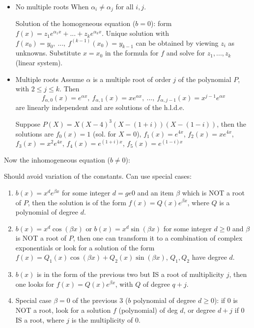 \begin{itemize}
    \item No multiple roots
          When $\alpha_i \ne \alpha_j$ for all $i, j$.

          Solution of the homogeneous equation ($b = 0$): form $f(x) = z_1 e^{\alpha_1 x} + ... + z_k e^{\alpha_k x}$.
          Unique solution with $f(x_0) = y_0,\ ...,\ f^{(k-1)}(x_0) = y_{k-1}$ can be obtained by viewing $z_i$ as unknowns. Substitute $x = x_0$ in
          the formula for $f$ and solve for $z_1, ..., z_k$ (linear system).

    \item Multiple roots
          Assume $\alpha$ is a multiple root of order $j$ of the polynomial $P$, with $2 \le j \le k$. Then
          \[ f_{\alpha,0}(x) = e^{\alpha x},\ f_{\alpha,1}(x) = x e^{\alpha x},\ ...,\ f_{\alpha,j-1}(x) = x^{j-1} e^{\alpha x} \]
          are linearly independent and are solutions of the h.l.d.e.

          \begin{example}
              Suppose $P(X) = X(X - 4)^3(X - (1+i))(X - (1 - i))$, then the solutions are
              $f_0(x) = 1$ (sol. for $X=0$), $f_1(x) = e^{4x}$, $f_2(x) = xe^{4x}$, $f_3(x) = x^2 e^{4x}$,
              $f_4(x) = e^{(1+i) x}$, $f_5(x) = e^{(1-i) x}$
          \end{example}

\end{itemize}

Now the inhomogeneous equation ($b \ne 0$):

Should avoid variation of the constants. Can use special cases:
\begin{enumerate}
    \item $b(x) = x^d e^{\beta x}$ for some integer $d =ge 0$ and an item $\beta$ which is NOT a root of $P$, then
          the solution is of the form $f(x) = Q(x) e^{\beta x}$, where $Q$ is a polynomial of degree $d$.
    \item $b(x) = x^d \cos(\beta x)$ or $b(x) = x^d \sin(\beta x)$ for some integer $d \ge 0$ and $\beta$ is NOT a root of $P$, then
          one can transform it to a combination of complex exponentials or look for a solution of the form
          $f(x) = Q_1(x) \cos(\beta x) + Q_2(x) \sin(\beta x)$, $Q_1, Q_2$ have degree $d$.
    \item $b(x)$ is in the form of the previous two but IS a root of multiplicity $j$, then one looks for $f(x) = Q(x) e^{\beta x} $,
          with $Q$ of degree $q + j$.
    \item Special case $\beta = 0$ of the previous 3 ($b$ polynomial of degree $d \ge 0$): if $0$ is NOT a root, look for a
          solution $f$ (polynomial) of deg $d$, or degree $d + j$ if $0$ IS a root, where $j$ is the multiplicity of $0$.
\end{enumerate}

